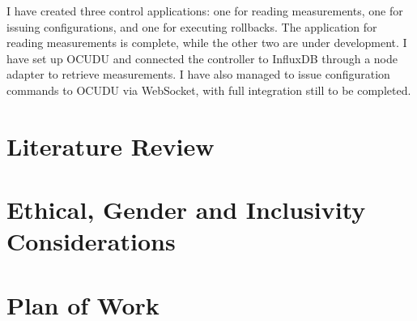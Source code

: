 \documentclass[12pt,a4paper]{article}
\begin{document}
I have created three control applications: one for reading measurements, one for issuing configurations, and one for executing rollbacks. The application for reading measurements is complete, while the other two are under development. I have set up OCUDU and connected the controller to InfluxDB through a node adapter to retrieve measurements. I have also managed to issue configuration commands to OCUDU via WebSocket, with full integration still to be completed.


\section{Literature Review}

\section{Ethical, Gender and Inclusivity Considerations}

\section{Plan of Work}



\end{document}

